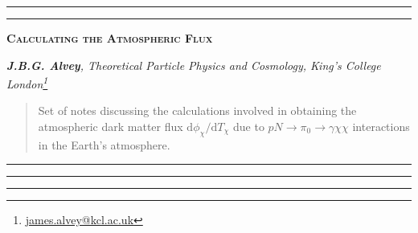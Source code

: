 \documentclass[10pt]{article}
\renewcommand*{\thefootnote}{\fnsymbol{footnote}}
\begin{document}
\hrule
\vspace{1pt}
\hrule
\begin{center}
\large\textsc{\color{darkblue}\textbf{Calculating the Atmospheric Flux}}
\vspace{5pt}

\footnotesize\textit{\textbf{J.B.G. Alvey}, Theoretical Particle Physics and Cosmology, King's College London\footnote{\href{mailto:james.alvey@kcl.ac.uk}{james.alvey@kcl.ac.uk}}}
\end{center}
\begin{abstract}
\noindent Set of notes discussing the calculations involved in obtaining the atmospheric dark matter flux $\textrm{d}\phi_\chi/\textrm{d}T_\chi$ due to $pN \rightarrow \pi_0 \rightarrow \gamma\chi\chi$ interactions in the Earth's atmosphere.
\end{abstract}
\hrule
\tableofcontents
\vspace{5pt}
\hrule
\vspace{1pt}
\hrule
\vspace{10pt}
\renewcommand{\thefootnote}{\tiny\textbf{\arabic{section}.\arabic{footnote}}}
\end{document}

